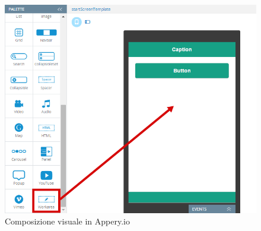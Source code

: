 \begin{figure}[ht]
	\centering
	\includegraphics[width=\textwidth]{2-nozioni-preliminari/Immagini/appery-visual-composition.png}
	\caption{Composizione visuale in Appery.io}\label{fig:appery-visual-composition}
\end{figure}

